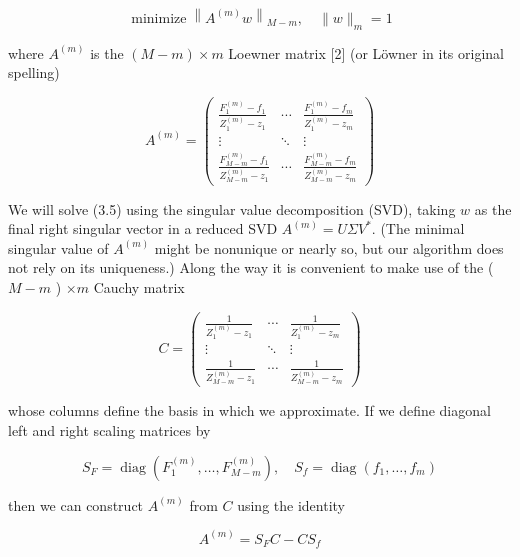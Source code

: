 \documentclass[11pt]{article}
\theoremstyle{definition}
\begin{document}
    
    \begin{equation*}
    \operatorname{minimize}\left\|A^{(m)} w\right\|_{M-m}, \quad\|w\|_{m}=1 \tag{3.5}
    \end{equation*}
    
    
    where $A^{(m)}$ is the $(M-m) \times m$ Loewner matrix [2] (or Löwner in its original spelling)
    
    \[
    A^{(m)}=\left(\begin{array}{ccc}
    \frac{F_{1}^{(m)}-f_{1}}{Z_{1}^{(m)}-z_{1}} & \cdots & \frac{F_{1}^{(m)}-f_{m}}{Z_{1}^{(m)}-z_{m}}  \tag{3.6}\\
    \vdots & \ddots & \vdots \\
    \frac{F_{M-m}^{(m)}-f_{1}}{Z_{M-m}^{(m)}-z_{1}} & \cdots & \frac{F_{M-m}^{(m)}-f_{m}}{Z_{M-m}^{(m)}-z_{m}}
    \end{array}\right)
    \]
    
    We will solve (3.5) using the singular value decomposition (SVD), taking $w$ as the final right singular vector in a reduced SVD $A^{(m)}=U \Sigma V^{*}$. (The minimal singular value of $A^{(m)}$ might be nonunique or nearly so, but our algorithm does not rely on its uniqueness.) Along the way it is convenient to make use of the ( $M-m$ ) $\times m$ Cauchy matrix
    
    \[
    C=\left(\begin{array}{ccc}
    \frac{1}{Z_{1}^{(m)}-z_{1}} & \cdots & \frac{1}{Z_{1}^{(m)}-z_{m}}  \tag{3.7}\\
    \vdots & \ddots & \vdots \\
    \frac{1}{Z_{M-m}^{(m)}-z_{1}} & \cdots & \frac{1}{Z_{M-m}^{(m)}-z_{m}}
    \end{array}\right)
    \]
    
    whose columns define the basis in which we approximate. If we define diagonal left and right scaling matrices by
    
    
    \begin{equation*}
    S_{F}=\operatorname{diag}\left(F_{1}^{(m)}, \ldots, F_{M-m}^{(m)}\right), \quad S_{f}=\operatorname{diag}\left(f_{1}, \ldots, f_{m}\right) \tag{3.8}
    \end{equation*}
    
    
    then we can construct $A^{(m)}$ from $C$ using the identity
    
    
    \begin{equation*}
    A^{(m)}=S_{F} C-C S_{f} \tag{3.9}
    \end{equation*}
    
\end{document}
